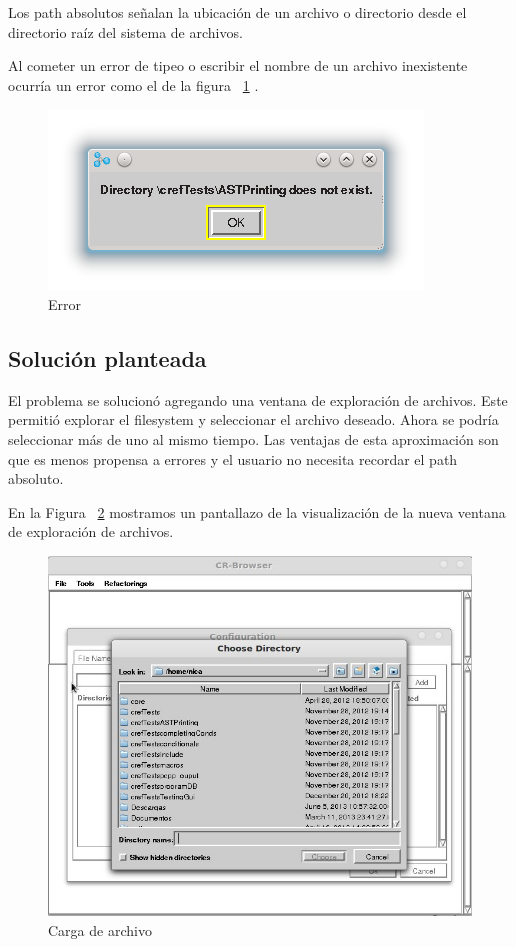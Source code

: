 \documentclass[a4paper,oneside,12pt]{article}
\begin{document}
Los path absolutos señalan la ubicaci\'on de un archivo o directorio desde el directorio ra\'iz del sistema de archivos.

Al cometer un error de tipeo o escribir el nombre de un archivo inexistente ocurr\'ia un error como el de la figura ~\ref{error} .

\begin{figure}[h!]
  \centering
    \includegraphics[scale=0.85]{images/codigo_original/error.png}
    \caption{Error}
    \label{error}
\end{figure}

\subsection{Soluci\'on planteada}
El problema se solucion\'o agregando una ventana de exploraci\'on de archivos. Este permiti\'o explorar el filesystem y seleccionar el archivo deseado. Ahora se podr\'ia seleccionar m\'as de uno al mismo tiempo.
Las ventajas de esta aproximaci\'on son que es menos propensa a errores y el usuario no necesita recordar el path absoluto.

En la Figura ~\ref{carga_archivo} mostramos un pantallazo de la visualizaci\'on de la nueva ventana de exploraci\'on de archivos.

\begin{figure}[h!]
  \centering
    \includegraphics[scale=0.50]{images/codigo_modificado/seleccionar_directorio.jpg}
     \caption{Carga de archivo}
     \label{carga_archivo}
\end{figure}
\end{document}
